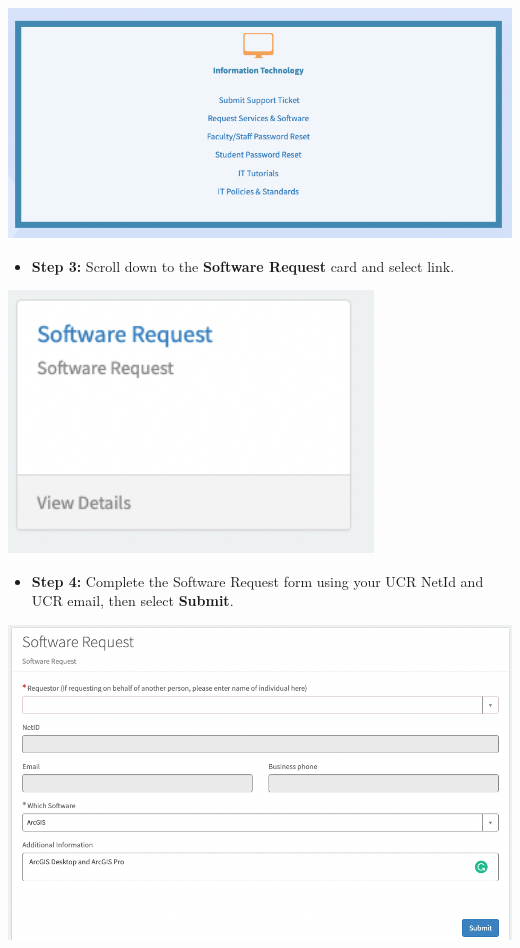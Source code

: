 \documentclass[
]{book}
\providecommand{\tightlist}{%
  \setlength{\itemsep}{0pt}\setlength{\parskip}{0pt}}
\begin{document}
\begin{center}\includegraphics[width=11.57in]{images/ServiceLink} \end{center}

\begin{itemize}
\tightlist
\item
  \textbf{Step 3:} Scroll down to the \textbf{Software Request} card and select link.
\end{itemize}

\begin{flushleft}\includegraphics[width=3.81in]{images/softwarerequest} \end{flushleft}

\begin{itemize}
\tightlist
\item
  \textbf{Step 4:} Complete the Software Request form using your UCR NetId and UCR email, then select \textbf{Submit}.
\end{itemize}

\begin{center}\includegraphics[width=13.19in]{images/requestsubmit} \end{center}
\end{document}
